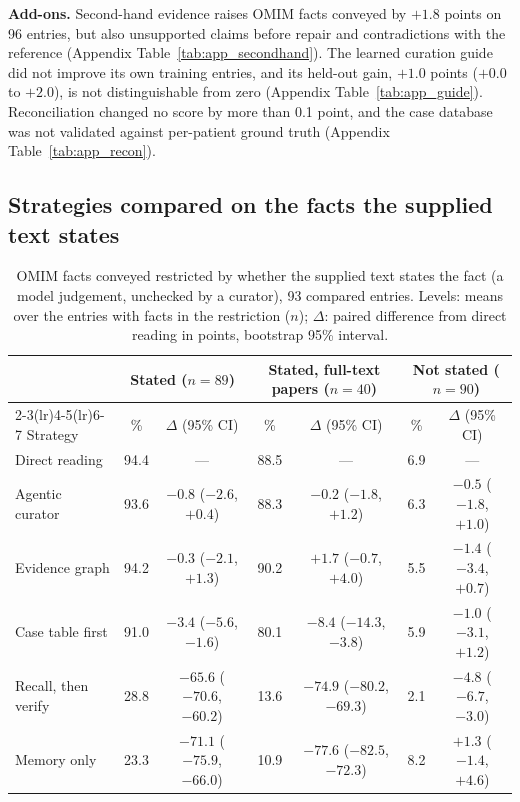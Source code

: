 \documentclass{article} %
\begin{document}
\textbf{Add-ons.}\label{sec:addons} Second-hand evidence raises OMIM facts conveyed by $+1.8$ points on 96 entries, but also unsupported claims before repair and contradictions with the reference (Appendix Table~\ref{tab:app_secondhand}). The learned curation guide did not improve its own training entries, and its held-out gain, $+1.0$ points ($+0.0$ to $+2.0$), is not distinguishable from zero (Appendix Table~\ref{tab:app_guide}). Reconciliation changed no score by more than 0.1 point, and the case database was not validated against per-patient ground truth (Appendix Table~\ref{tab:app_recon}).

\subsection{Strategies compared on the facts the supplied text states}
\label{sec:stated}
\begin{table}[t]
\caption{OMIM facts conveyed restricted by whether the supplied text states the fact (a model judgement, unchecked by a curator), 93 compared entries. Levels: means over the entries with facts in the restriction ($n$); $\Delta$: paired difference from direct reading in points, bootstrap 95\% interval.}
\label{tab:stated}
\begin{center}
\footnotesize
\setlength{\tabcolsep}{2.6pt}
\begin{tabular}{lcccccc}
\toprule
 & \multicolumn{2}{c}{Stated ($n=89$)} & \multicolumn{2}{c}{Stated, full-text papers ($n=40$)} & \multicolumn{2}{c}{Not stated ($n=90$)} \\
\cmidrule(lr){2-3}\cmidrule(lr){4-5}\cmidrule(lr){6-7}
Strategy & \% & $\Delta$ (95\% CI) & \% & $\Delta$ (95\% CI) & \% & $\Delta$ (95\% CI) \\
\midrule
Direct reading & 94.4 & --- & 88.5 & --- & 6.9 & --- \\
Agentic curator & 93.6 & $-0.8$ ($-2.6$, $+0.4$) & 88.3 & $-0.2$ ($-1.8$, $+1.2$) & 6.3 & $-0.5$ ($-1.8$, $+1.0$) \\
Evidence graph & 94.2 & $-0.3$ ($-2.1$, $+1.3$) & 90.2 & $+1.7$ ($-0.7$, $+4.0$) & 5.5 & $-1.4$ ($-3.4$, $+0.7$) \\
Case table first & 91.0 & $-3.4$ ($-5.6$, $-1.6$) & 80.1 & $-8.4$ ($-14.3$, $-3.8$) & 5.9 & $-1.0$ ($-3.1$, $+1.2$) \\
Recall, then verify & 28.8 & $-65.6$ ($-70.6$, $-60.2$) & 13.6 & $-74.9$ ($-80.2$, $-69.3$) & 2.1 & $-4.8$ ($-6.7$, $-3.0$) \\
Memory only & 23.3 & $-71.1$ ($-75.9$, $-66.0$) & 10.9 & $-77.6$ ($-82.5$, $-72.3$) & 8.2 & $+1.3$ ($-1.4$, $+4.6$) \\
\bottomrule
\end{tabular}
\end{center}
\end{table}
\end{document}
